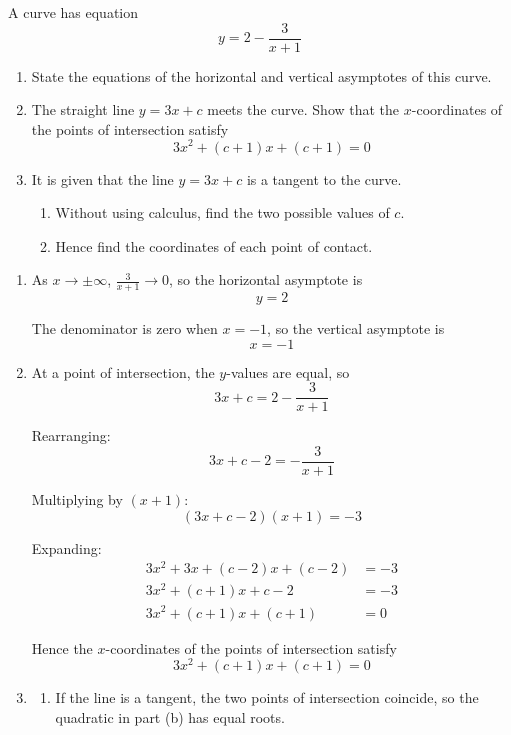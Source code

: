 \documentclass[leqno]{article}
\begin{document}
\begin{enumerate}[
  label=\textbf{\arabic*.},
  leftmargin=*,
  topsep=0pt,
  partopsep=0pt,
  parsep=0pt
]
A curve has equation
\[
y = 2 - \frac{3}{x+1}
\]
\begin{enumerate}[label=\textbf{(\alph*)}]
  \item State the equations of the horizontal and vertical asymptotes of this curve.  \\
  \item The straight line $y=3x+c$ meets the curve. Show that the $x$-coordinates of the points of intersection satisfy
  \[
  3x^2+(c+1)x+(c+1)=0
  \]
  \item It is given that the line $y=3x+c$ is a tangent to the curve. \\
  \begin{enumerate}[label=(\roman*)]
    \item Without using calculus, find the two possible values of $c$.  
    \item Hence find the coordinates of each point of contact. 
  \end{enumerate}
\end{enumerate}

\vspace*{10pt}

\begin{djsSolution}
\begin{enumerate}[label=\textbf{(\alph*)}]
  \item As \(x\to\pm\infty\), \(\frac{3}{x+1}\to 0\), so the horizontal asymptote is
  \[
  y=2
  \]

  The denominator is zero when \(x=-1\), so the vertical asymptote is
  \[
  x=-1
  \]

  \item At a point of intersection, the $y$-values are equal, so
  \[
  3x+c = 2-\frac{3}{x+1}
  \]

  Rearranging:
  \[
  3x+c-2=-\frac{3}{x+1}
  \]

  Multiplying by $(x+1)$:
  \[
  (3x+c-2)(x+1)=-3
  \]

  Expanding:
  \begin{align*}
  3x^2+3x+(c-2)x+(c-2) &= -3 \\
  3x^2+(c+1)x+c-2 &= -3 \\
  3x^2+(c+1)x+(c+1) &= 0
  \end{align*}

  Hence the $x$-coordinates of the points of intersection satisfy
  \[
  3x^2+(c+1)x+(c+1)=0
  \]

  \item \begin{enumerate}[label=(\roman*)]
    \item If the line is a tangent, the two points of intersection coincide, so the quadratic in part (b) has equal roots.


\end{enumerate}
\end{enumerate}
\end{djsSolution}
\end{enumerate}
\end{document}
